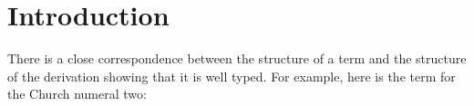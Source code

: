 \begin{fence}
\begin{code}%
\>[0]\AgdaSpace{}%
\AgdaSpace{}%
\AgdaSpace{}%
\<%
\\
\>[0]\AgdaSpace{}%
\AgdaSpace{}%
\AgdaSpace{}%
\AgdaSymbol{(}\AgdaSymbol{;}\AgdaSpace{}%
\AgdaSymbol{)}\<%
\\
\>[0]\AgdaSpace{}%
\AgdaSpace{}%
\AgdaSpace{}%
\AgdaSpace{}%
\AgdaSymbol{(}\AgdaSymbol{;}\AgdaSpace{}%
\AgdaSymbol{)}\<%
\\
\>[0]\AgdaSpace{}%
\AgdaSpace{}%
\AgdaSpace{}%
\AgdaSpace{}%
\AgdaSymbol{(}\AgdaSymbol{;}\AgdaSpace{}%
\AgdaSymbol{;}\AgdaSpace{}%
\AgdaSymbol{;}\AgdaSpace{}%
\AgdaOperator{\AgdaFunction{\AgdaUnderscore{}<\AgdaUnderscore{}}}\AgdaSymbol{;}\AgdaSpace{}%
\AgdaSymbol{;}\AgdaSpace{}%
\AgdaSymbol{;}\AgdaSpace{}%
\AgdaSymbol{)}\<%
\\
\>[0]\AgdaSpace{}%
\AgdaSpace{}%
\AgdaSpace{}%
\AgdaSpace{}%
\AgdaSymbol{(}\AgdaSymbol{)}\<%
\\
\>[0]\AgdaSpace{}%
\AgdaSpace{}%
\AgdaSpace{}%
\AgdaSpace{}%
\AgdaSymbol{(}\AgdaSymbol{;}\AgdaSpace{}%
\AgdaSymbol{)}\<%
\end{code}
\end{fence}

\hypertarget{introduction}{%
\section{Introduction}\label{introduction}}

There is a close correspondence between the structure of a term and the
structure of the derivation showing that it is well typed. For example,
here is the term for the Church numeral two:

